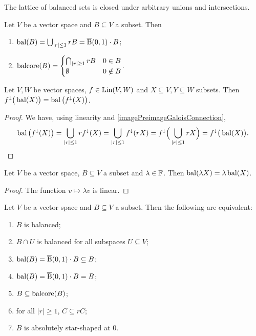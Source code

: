 \begin{proposition}
The lattice of balanced sets is closed under arbitrary unions and intersections.
\end{proposition}

\begin{lemma} \label{balancedClosures}
Let $V$ be a vector space and $B\subseteq V$ a subset. Then
\begin{enumerate}
\item $\operatorname{bal}(B) = \bigcup_{|r|\leq 1}rB = \operatorname{\overline{B}}(0,1)\cdot B$;
\item $\operatorname{balcore}(B) = \begin{cases}
\bigcap_{|r|\geq 1}rB & 0\in B\\
\emptyset & 0\notin B
\end{cases}$.
\end{enumerate}
\end{lemma}
\begin{corollary} \label{linearFunctionsPreserveBalancedHull}
Let $V,W$ be vector spaces, $f\in \operatorname{Lin}(V,W)$ and $X\subseteq V, Y\subseteq W$ subsets. Then $f^\downarrow\big(\operatorname{bal}(X)\big) = \operatorname{bal}\big(f^\downarrow(X)\big)$.
\end{corollary}
\begin{proof}
We have, using linearity and \ref{imagePreimageGaloisConnection},
\[ \operatorname{bal}\big(f^\downarrow(X)\big) = \bigcup_{|r|\leq 1}rf^{\downarrow}(X) = \bigcup_{|r|\leq 1}f^{\downarrow}(rX) = f^{\downarrow}\Big(\bigcup_{|r|\leq 1}rX\Big) = f^{\downarrow}\big(\operatorname{bal}(X)\big). \]
\end{proof}
\begin{corollary} \label{balancedHullHomogeneous}
Let $V$ be a vector space, $B\subseteq V$ a subset and $\lambda\in \mathbb{F}$. Then $\operatorname{bal}(\lambda X) = \lambda \operatorname{bal}(X)$.
\end{corollary}
\begin{proof}
The function $v\mapsto \lambda v$ is linear.
\end{proof}

\begin{lemma}
Let $V$ be a vector space and $B\subseteq V$ a subset. Then the following are equivalent:
\begin{enumerate}
\item $B$ is balanced;
\item $B\cap U$ is balanced for all subspaces $U\subseteq V$;
\item $\operatorname{bal}(B) = \operatorname{\overline{B}}(0,1)\cdot B \subseteq B$;
\item $\operatorname{bal}(B) = \operatorname{\overline{B}}(0,1)\cdot B = B$;
\item $B\subseteq \operatorname{balcore}(B)$;
\item for all $|r|\geq 1$, $C\subseteq rC$;
\item $B$ is absolutely star-shaped at $0$.
\end{enumerate}
\end{lemma}

